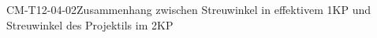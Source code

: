 
\begin{CONC}{CM-T12-04-02}{Zusammenhang zwischen Streuwinkel in effektivem 1KP und Streuwinkel des Projektils im 2KP}
\end{CONC}
